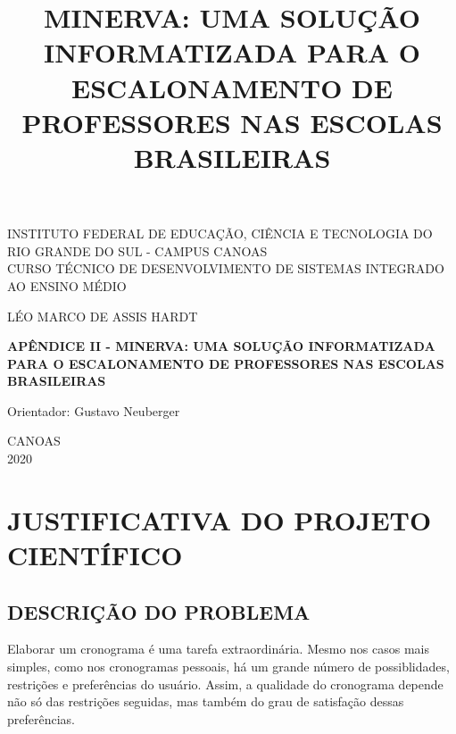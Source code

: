 \documentclass[12pt,a4paper]{article}
\title{MINERVA: UMA SOLUÇÃO INFORMATIZADA PARA O ESCALONAMENTO DE PROFESSORES NAS ESCOLAS BRASILEIRAS}
\newenvironment{bottompar}{\par\vspace*{\fill}}{\clearpage}
\begin{document}
	\thispagestyle{empty}

	\begin{center}
		INSTITUTO FEDERAL DE EDUCAÇÃO, CIÊNCIA E TECNOLOGIA DO RIO GRANDE DO SUL - CAMPUS CANOAS \\
		CURSO TÉCNICO DE DESENVOLVIMENTO DE SISTEMAS INTEGRADO AO ENSINO MÉDIO\\
	\end{center}

	\vskip 3cm

	\begin{center}
		LÉO MARCO DE ASSIS HARDT
	\end{center}

	\vskip 5cm

	\begin{center}
		\textbf{APÊNDICE II - MINERVA: UMA SOLUÇÃO INFORMATIZADA PARA O ESCALONAMENTO DE PROFESSORES NAS ESCOLAS BRASILEIRAS}
	\end{center}

	\vskip 5cm

	\begin{center}
		Orientador: Gustavo Neuberger
	\end{center}



	\begin{bottompar}
		\begin{center}
		CANOAS \\
		2020
		\end{center}
	\end{bottompar}

    \section{JUSTIFICATIVA DO PROJETO CIENTÍFICO}

		\subsection{DESCRIÇÃO DO PROBLEMA}


			\par Elaborar um cronograma é uma tarefa extraordinária. Mesmo nos casos mais simples, como nos cronogramas pessoais, há um grande número de possiblidades, restrições e preferências do usuário. Assim, a qualidade do cronograma depende não só das restrições seguidas, mas também do grau de satisfação dessas preferências.
\end{document}
